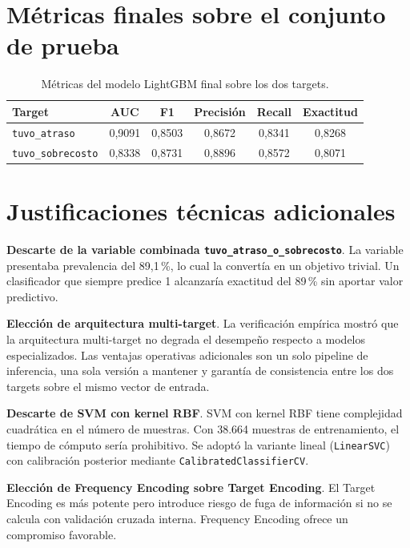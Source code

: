 \documentclass[12pt,letterpaper,oneside]{report}
\begin{document}
\section{Métricas finales sobre el conjunto de prueba}

\begin{table}[h!]
\centering
\caption{Métricas del modelo LightGBM final sobre los dos targets.}
\label{tab:metricas_final}
\begin{tabular}{lccccc}
\toprule
\textbf{Target} & \textbf{AUC} & \textbf{F1} & \textbf{Precisión} & \textbf{Recall} & \textbf{Exactitud} \\
\midrule
\texttt{tuvo\_atraso} & 0,9091 & 0,8503 & 0,8672 & 0,8341 & 0,8268 \\
\texttt{tuvo\_sobrecosto} & 0,8338 & 0,8731 & 0,8896 & 0,8572 & 0,8071 \\
\bottomrule
\end{tabular}
\end{table}

\section{Justificaciones técnicas adicionales}

\textbf{Descarte de la variable combinada \texttt{tuvo\_atraso\_o\_sobrecosto}}.
La variable presentaba prevalencia del 89,1\,\%, lo cual la convertía en un
objetivo trivial. Un clasificador que siempre predice 1 alcanzaría exactitud
del 89\,\% sin aportar valor predictivo.

\textbf{Elección de arquitectura multi-target}. La verificación empírica
mostró que la arquitectura multi-target no degrada el desempeño respecto a
modelos especializados. Las ventajas operativas adicionales son un solo
pipeline de inferencia, una sola versión a mantener y garantía de
consistencia entre los dos targets sobre el mismo vector de entrada.

\textbf{Descarte de SVM con kernel RBF}. SVM con kernel RBF tiene complejidad
cuadrática en el número de muestras. Con 38.664 muestras de entrenamiento,
el tiempo de cómputo sería prohibitivo. Se adoptó la variante lineal
(\texttt{LinearSVC}) con calibración posterior mediante
\texttt{CalibratedClassifierCV}.

\textbf{Elección de Frequency Encoding sobre Target Encoding}. El Target
Encoding es más potente pero introduce riesgo de fuga de información si no
se calcula con validación cruzada interna. Frequency Encoding ofrece un
compromiso favorable.
\end{document}
